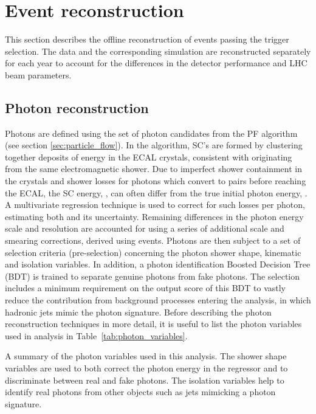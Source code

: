 \newpage
\section{Event reconstruction}\label{sec:event_reconstruction}
This section describes the offline reconstruction of events passing the trigger selection. The data and the corresponding simulation are reconstructed separately for each year to account for the differences in the detector performance and LHC beam parameters. 

\subsection{Photon reconstruction}\label{sec:photon_reconstruction}
Photons are defined using the set of photon candidates from the PF algorithm (see section \ref{sec:particle_flow}). In the algorithm, SC's are formed by clustering together deposits of energy in the ECAL crystals, consistent with originating from the same electromagnetic shower. Due to imperfect shower containment in the crystals and shower losses for photons which convert to \ee pairs before reaching the ECAL, the SC energy, \Eraw, can often differ from the true initial photon energy, \Etrue. A multivariate regression technique is used to correct for such losses per photon, estimating both \Etrue and its uncertainty. Remaining differences in the photon energy scale and resolution are accounted for using a series of additional scale and smearing corrections, derived using \Zee events. Photons are then subject to a set of selection criteria (pre-selection) concerning the photon shower shape, kinematic and isolation variables. In addition, a photon identification Boosted Decision Tree (BDT) is trained to separate genuine photons from fake photons. The selection includes a minimum requirement on the output score of this BDT to vastly reduce the contribution from background processes entering the analysis, in which hadronic jets mimic the photon signature. Before describing the photon reconstruction techniques in more detail, it is useful to list the photon variables used in \Hgg analysis in Table~\ref{tab:photon_variables}.

\begin{table}[htb!]
    \caption[Photon variables]{A summary of the photon variables used in this analysis. The shower shape variables are used to both correct the photon energy in the regressor and to discriminate between real and fake photons. The isolation variables help to identify real photons from other objects such as jets mimicking a photon signature.}
    \label{tab:photon_variables}
    \centering
    \scriptsize
    \renewcommand{\arraystretch}{2}
    \hspace*{-1.5cm}
    
    \hspace*{-1.5cm}
\end{table}

